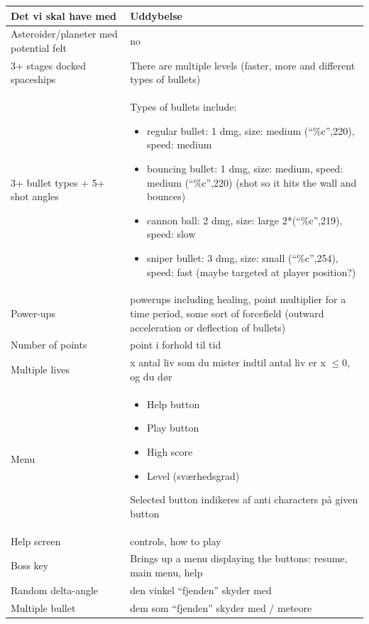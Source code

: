 \begin{table}[h!]
\centering
\begin{tabularx}{\textwidth}{|l|X|}
\hline
\textbf{Det vi skal have med} & \textbf{Uddybelse} \\
\hline
Asteroider/planeter med potential felt & no \\
\hline
3+ stages docked spaceships & There are multiple levels (faster, more and different types of bullets) \\
\hline
3+ bullet types + 5+ shot angles & Types of bullets include:
\begin{itemize}[leftmargin=*]
    \item regular bullet: 1 dmg, size: medium (“\%c”,220), speed: medium
    \item bouncing bullet: 1 dmg, size: medium, speed: medium (“\%c”,220) (shot so it hits the wall and bounces)
    \item cannon ball: 2 dmg, size: large 2*(“\%c”,219), speed: slow
    \item sniper bullet: 3 dmg, size: small (“\%c”,254), speed: fast (maybe targeted at player position?)
\end{itemize} \\
\hline
Power-ups & powerups including healing, point multiplier for a time period, some sort of forcefield (outward acceleration or deflection of bullets) \\
\hline
Number of points & point i forhold til tid \\
\hline
Multiple lives & x antal liv som du mister indtil antal liv er x $\leq 0$, og du dør \\
\hline
Menu & 
\begin{itemize}[leftmargin=*]
    \item Help button
    \item Play button
    \item High score
    \item Level (sværhedsgrad)
\end{itemize}
Selected button indikeres af anti characters på given button \\
\hline
Help screen & controls, how to play \\
\hline
Boss key & Brings up a menu displaying the buttons: resume, main menu, help \\
\hline
Random delta-angle & den vinkel “fjenden” skyder med \\
\hline
Multiple bullet & dem som “fjenden” skyder med / meteore \\
\hline

\end{tabularx}
\end{table}
